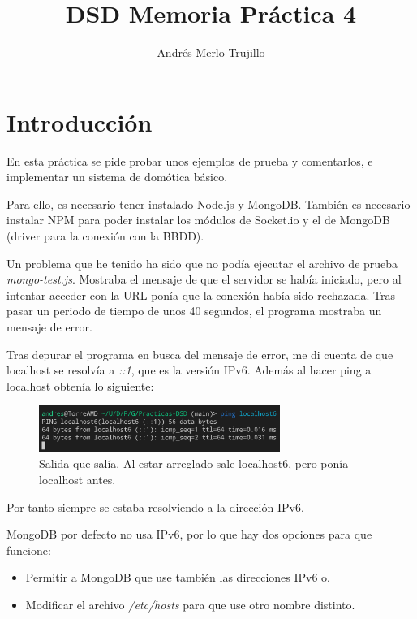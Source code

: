 \documentclass{article}
\title{DSD Memoria Práctica 4}
\author{Andrés Merlo Trujillo}
\date{}
\begin{document}

\maketitle

\tableofcontents

\newpage

\section{Introducción}
En esta práctica se pide probar unos ejemplos de prueba y comentarlos, e implementar un sistema de domótica básico.

Para ello, es necesario tener instalado Node.js y MongoDB. También es necesario instalar NPM para poder instalar los módulos de Socket.io y el de MongoDB (driver para la conexión con la BBDD).

Un problema que he tenido ha sido que no podía ejecutar el archivo de prueba \textit{mongo-test.js}. Mostraba el mensaje de que el servidor se había iniciado, pero al intentar acceder con la URL ponía que la conexión había sido rechazada. Tras pasar un periodo de tiempo de unos 40 segundos, el programa mostraba un mensaje de error.

Tras depurar el programa en busca del mensaje de error, me di cuenta de que localhost se resolvía a \textit{::1}, que es la versión IPv6. Además al hacer ping a localhost obtenía lo siguiente:

\begin{figure}[H]
    \centering
    \includegraphics[width=0.7\textwidth]{images/ping.png}
    \caption{Salida que salía. Al estar arreglado sale localhost6, pero ponía localhost antes.}
\end{figure}

Por tanto siempre se estaba resolviendo a la dirección IPv6.

MongoDB por defecto no usa IPv6, por lo que hay dos opciones para que funcione:

\begin{itemize}
    \item Permitir a MongoDB que use también las direcciones IPv6 o.
    
    \item Modificar el archivo \textit{/etc/hosts} para que use otro nombre distinto.
\end{itemize}
\end{document}

